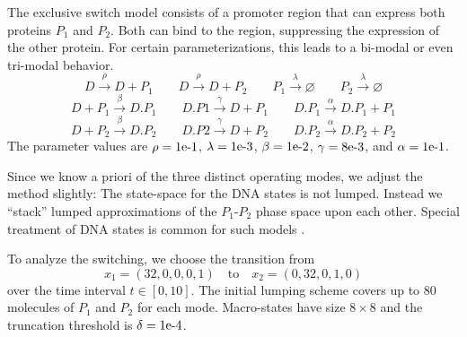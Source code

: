 \begin{model} The exclusive switch model consists of a promoter region
that can express both proteins $P_1$ and $P_2$. Both can bind to the region, suppressing
the expression of the other protein. For certain parameterizations, this leads to a
bi-modal or even tri-modal behavior.
$$ D \xrightarrow{\rho} D + P_1 \qquad D \xrightarrow{\rho} D + P_2 \qquad P_1 \xrightarrow{\lambda}\varnothing \qquad P_2 \xrightarrow{\lambda} \varnothing $$
$$ D + P_1 \xrightarrow{\beta} D.P_1 \qquad D.P1 \xrightarrow\gamma D + P_1 \qquad D.P_1 \xrightarrow\alpha D.P_1 + P_1 $$
$$ D + P_2 \xrightarrow{\beta} D.P_2 \qquad D.P2 \xrightarrow{\gamma} D + P_2 \qquad D.P_2 \xrightarrow\alpha D.P_2 + P_2 $$
The parameter values are $\rho= \text{1e-1} $, $\lambda= \text{1e-3} $, $\beta= \text{1e-2} $, $\gamma= \text{8e-3} $, and $\alpha= \text{1e-1} $.
\end{model}
Since we know a priori of the three distinct operating modes, we adjust
the method slightly:
The state-space for the \ac{DNA} states is not lumped. Instead we ``stack''
lumped approximations of the $P_1$-$P_2$ phase space upon each other. Special treatment of \ac{DNA} states is common for such models \cite{lapin2011shave}. 

To analyze the switching, we choose the transition from
$$ x_{1} = (32, 0, 0, 0, 1) 
\quad\text{to}\quad
 x_2 = (0, 32, 0, 1, 0) $$
over the time interval $t\in[0,10]$.
The initial lumping scheme covers up to 80 molecules of $P_1$ and $P_2$ for each mode.
Macro-states have size $8\times8$ and
the truncation threshold is $\delta= \text{1e-4} $.

